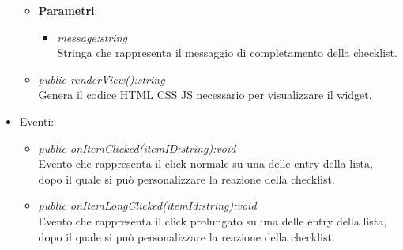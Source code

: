 \begin{itemize}
\begin{itemize}
		\item{\textbf{Parametri}: \begin{itemize}
		\item \textit{message:string}\\
		Stringa che rappresenta il messaggio di completamento della checklist.
		\end{itemize}}
	\item \textit{public renderView():string}\\
	Genera il codice HTML CSS JS necessario per visualizzare il widget.
	\end{itemize}
\item{Eventi}:
	\begin{itemize}
	\item \textit{public onItemClicked(itemID:string):void}\\
	Evento che rappresenta il click normale su una delle entry della lista, dopo il quale si può personalizzare la reazione della checklist.
	\item \textit{public onItemLongClicked(itemId:string):void}\\
	Evento che rappresenta il click prolungato su una delle entry della lista, dopo il quale si può personalizzare la reazione della checklist.
	\end{itemize}
\end{itemize}

